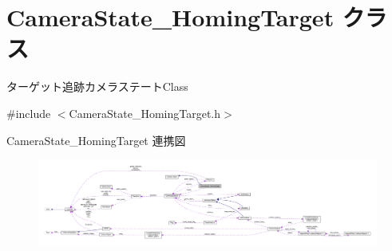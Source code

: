 \hypertarget{class_camera_state___homing_target}{}\section{Camera\+State\+\_\+\+Homing\+Target クラス}
\label{class_camera_state___homing_target}


ターゲット追跡カメラステート\+Class  




{\ttfamily \#include $<$Camera\+State\+\_\+\+Homing\+Target.\+h$>$}



Camera\+State\+\_\+\+Homing\+Target 連携図\nopagebreak
\begin{figure}[H]
\begin{center}
\leavevmode
\includegraphics[width=350pt]{class_camera_state___homing_target__coll__graph}
\end{center}
\end{figure}
